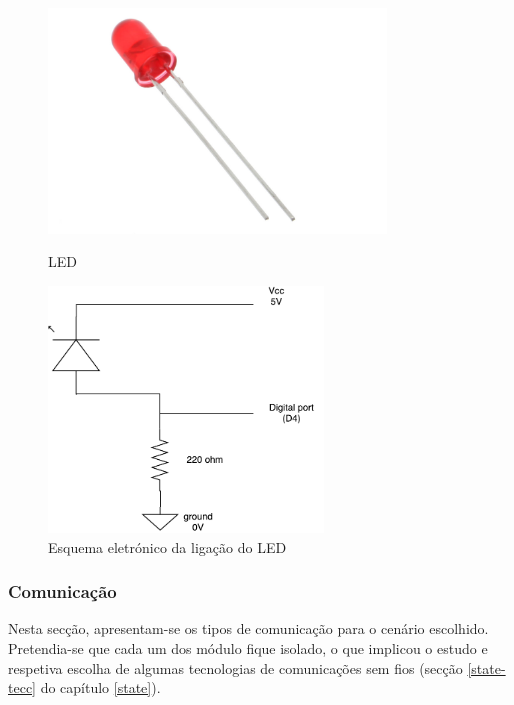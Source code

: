 \begin{figure}[h]
	\centering
	\begin{minipage}[b]{0.49\textwidth}
		\centering
		\includegraphics[width=0.8\textwidth]{img/hardware/led.jpg}
		\caption{\ac{LED}}
	\end{minipage}
	\hfill
	\begin{minipage}[b]{0.49\textwidth}
		\centering
		\includegraphics[width=0.65\textwidth]{img/hardware/led_esquema.pdf}
		\caption{Esquema eletrónico da ligação do \ac{LED}}
		\label{ligacao}
	\end{minipage}
\end{figure}



\subsubsection{Comunicação}

Nesta secção, apresentam-se os tipos de comunicação para o cenário escolhido. Pretendia-se que cada um dos módulo fique isolado, o que implicou o estudo e respetiva escolha de algumas tecnologias de comunicações sem fios (secção \ref{state-tecc} do capítulo \ref{state}). 

